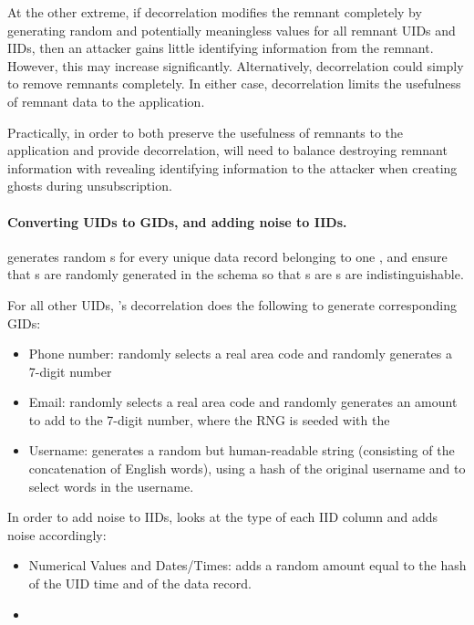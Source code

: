 At the other extreme, if decorrelation modifies the remnant completely by generating random and
potentially meaningless values for all remnant UIDs and IIDs, then an attacker gains little identifying
information from the remnant. However, this may increase \premnant{} significantly.
Alternatively, decorrelation could simply to remove remnants completely. In either case, decorrelation limits the usefulness of remnant data to the application. 

Practically, in order to both preserve the usefulness of remnants to the application and provide
decorrelation, \sys{} will need to balance destroying remnant information with revealing identifying
information to the attacker when creating ghosts during unsubscription. 

\paragraph{Converting UIDs to GIDs, and adding noise to IIDs.}

\sys{} generates random \gidkey{}s for every unique data record belonging to one
\uidkey{}, and ensure that \uidkey{}s are randomly generated in the schema so
that \gidkey{}s are \uidkey{}s are indistinguishable.

For all other UIDs, \sys's decorrelation does the following to generate corresponding GIDs:
\begin{itemize}
    \item Phone number: randomly selects a real area code and randomly generates a 7-digit number
    \item Email: randomly selects a real area code and randomly generates an amount to add to the 7-digit number, where the RNG is seeded with the \gidkey{}
    \item Username: generates a random but human-readable string (consisting of the
        concatenation of English words), using a hash of the original username and
        \gidkey{} to select words in the username.
\end{itemize}

In order to add noise to IIDs, \sys{} looks at the type of each IID column and
adds noise accordingly:
\begin{itemize}
\item Numerical Values and Dates/Times: adds a random amount equal to the
         hash of the UID time and \gidkey{} of the data record.
    \item 
\end{itemize}

